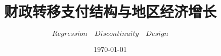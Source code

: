 \author[DongBei University Of Finance and Economics]{\textsl{$Regression\quad Discontinuity \quad Design$}}
\title{财政转移支付结构与地区经济增长}
\date{\today}

\subject{subject}



